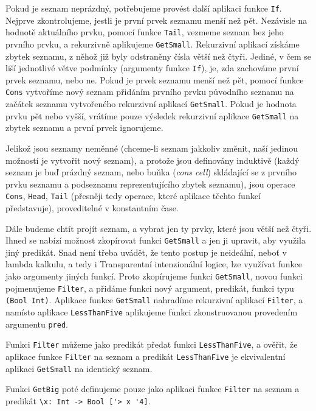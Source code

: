 Pokud je seznam neprázdný, potřebujeme provést další aplikaci funkce \lstinline{If}. Nejprve
zkontrolujeme, jestli je první prvek seznamu menší než pět. Nezávisle na hodnotě aktuálního prvku,
pomocí funkce \lstinline{Tail}, vezmeme seznam bez jeho prvního prvku, a rekurzivně aplikujeme
\lstinline{GetSmall}. Rekurzivní aplikací získáme zbytek seznamu, z něhož již byly odstraněny čísla
větší než čtyři. Jediné, v čem se liší jednotlivé větve podmínky (argumenty funkce \lstinline{If}),
je, zda zachováme první prvek seznamu, nebo ne. Pokud je prvek seznamu menší než pět, pomocí funkce
\lstinline{Cons} vytvoříme nový seznam přidáním prvního prvku původního seznamu na začátek seznamu
vytvořeného rekurzivní aplikací \lstinline{GetSmall}. Pokud je hodnota prvku pět nebo vyšší, vrátíme
pouze výsledek rekurzivní aplikace \lstinline{GetSmall} na zbytek seznamu a první prvek ignorujeme.

Jelikož jsou seznamy neměnné (chceme-li seznam jakkoliv změnit, naší jedinou možností je vytvořit
nový seznam), a protože jsou definovány induktivě (každý seznam je buď prázdný seznam, nebo buňka
(\textit{cons cell}) skládající se z prvního prvku seznamu a podseznamu reprezentujícího zbytek
seznamu), jsou operace \lstinline{Cons}, \lstinline{Head}, \lstinline{Tail} (přesněji tedy operace,
které aplikace těchto funkcí představuje), proveditelné v konstantním čase.

Dále budeme chtít projít seznam, a vybrat jen ty prvky, které jsou větší než čtyři. Ihned se nabízí
možnost zkopírovat funkci \lstinline{GetSmall} a jen ji upravit, aby využila jiný predikát. Snad
není třeba uvádět, že tento postup je neideální, neboť v lambda kalkulu, a tedy i Transparentní
intenzionální logice, lze využívat funkce jako argumenty jiných funkcí. Proto zkopírujeme funkci
\lstinline{GetSmall}, novou funkci pojmenujeme \lstinline{Filter}, a přidáme funkci nový argument,
predikát, funkci typu \lstinline{(Bool Int)}. Aplikace funkce \lstinline{GetSmall} nahradíme
rekurzivní aplikací \lstinline{Filter}, a namísto aplikace \lstinline{LessThanFive} aplikujeme
funkci zkonstruovanou provedením argumentu \lstinline{pred}.

Funkci \lstinline{Filter} můžeme jako predikát předat funkci \lstinline{LessThanFive}, a ověřit,
že aplikace funkce \lstinline{Filter} na seznam a predikát \lstinline{LessThanFive} je ekvivalentní
aplikaci \lstinline{GetSmall} na identický seznam.

Funkci \lstinline{GetBig} poté definujeme pouze jako aplikaci funkce \lstinline{Filter} na seznam
a predikát \lstinline{\x: Int -> Bool ['> x '4]}.

